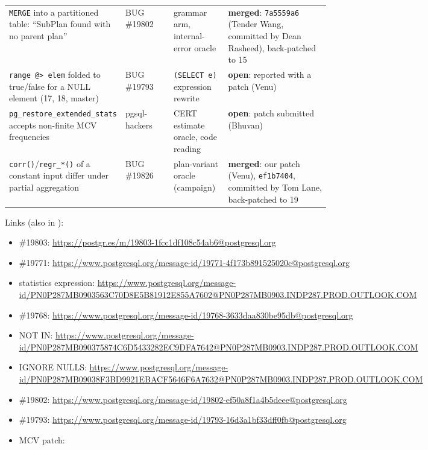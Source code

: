 \begin{center}
\begin{tabularx}{\linewidth}{@{}p{0.3\linewidth}p{0.15\linewidth}p{0.17\linewidth}X@{}}
\texttt{MERGE} into a partitioned table: ``SubPlan found with no parent plan'' & BUG \#19802 & grammar arm, internal-error oracle & \textbf{merged}: \texttt{7a5559a6} (Tender Wang, committed by Dean Rasheed), back-patched to 15 \\
\texttt{range @> elem} folded to true/false for a NULL element (17, 18, master) & BUG \#19793 & \texttt{(SELECT e)} expression rewrite & \textbf{open}: reported with a patch (Venu) \\
\texttt{pg\_restore\_extended\_stats} accepts non-finite MCV frequencies & pgsql-hackers & CERT estimate oracle, code reading & \textbf{open}: patch submitted (Bhuvan) \\
\texttt{corr()}/\texttt{regr\_*()} of a constant input differ under partial aggregation & BUG \#19826 & plan-variant oracle (campaign) & \textbf{merged}: our patch (Venu), \texttt{ef1b7404}, committed by Tom Lane, back-patched to 19 \\
\bottomrule
\end{tabularx}
\end{center}

Links (also in ):
\begin{itemize}
  \item \#19803: \url{https://postgr.es/m/19803-1fcc1df108c54ab6@postgresql.org}
  \item \#19771: \url{https://www.postgresql.org/message-id/19771-4f173b891525020c@postgresql.org}
  \item statistics expression: \url{https://www.postgresql.org/message-id/PN0P287MB0903563C70D8E5B81912E855A7602@PN0P287MB0903.INDP287.PROD.OUTLOOK.COM}
  \item \#19768: \url{https://www.postgresql.org/message-id/19768-3633daa830be95db@postgresql.org}
  \item NOT IN: \url{https://www.postgresql.org/message-id/PN0P287MB090375874C6D5433282EC9DFA7642@PN0P287MB0903.INDP287.PROD.OUTLOOK.COM}
  \item IGNORE NULLS: \url{https://www.postgresql.org/message-id/PN0P287MB09038F3BD9921EBACF5646F6A7632@PN0P287MB0903.INDP287.PROD.OUTLOOK.COM}
  \item \#19802: \url{https://www.postgresql.org/message-id/19802-ef50a8f1a4b5deee@postgresql.org}
  \item \#19793: \url{https://www.postgresql.org/message-id/19793-16d3a1bf33dff0fb@postgresql.org}
  \item MCV patch: 
\end{itemize}

